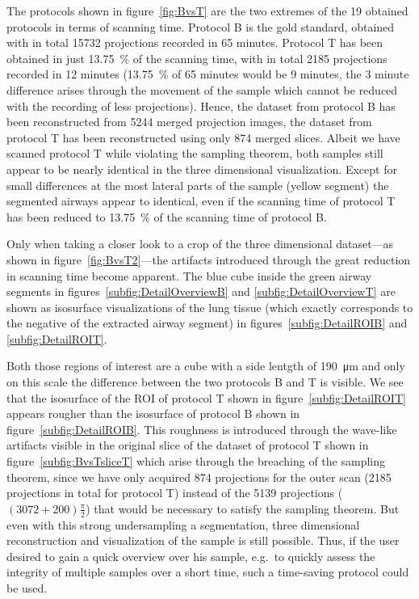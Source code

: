 The protocols shown in figure~\ref{fig:BvsT} are the two extremes of the 19 obtained protocols \cbstart in terms of scanning time. Protocol B is the gold standard, obtained with in total 15732 projections recorded in 65 minutes. Protocol T has been obtained in just \SI{13.75}{\percent} of the scanning time, with in total 2185 projections recorded in 12 minutes (\SI{13.75}{\percent} of 65 minutes would be 9 minutes, the 3 minute difference arises through the movement of the sample which cannot be reduced with the recording of less projections). Hence, the dataset from protocol B has been reconstructed from 5244 merged projection images, the dataset from protocol T has been reconstructed using only 874 merged slices. Albeit we have scanned protocol T while violating the sampling theorem, both samples still appear to be nearly identical in the three dimensional visualization. Except for small differences at the most lateral parts of the sample (yellow segment) the segmented airways appear to identical, even if the scanning time of protocol T has been reduced to \SI{13.75}{\percent} of the scanning time of protocol B.

Only when taking a closer look to a crop of the three dimensional dataset---as shown in figure~\ref{fig:BvsT2}---the artifacts introduced through the great reduction in scanning time become apparent. The blue cube inside the green airway segments in figures~\ref{subfig:DetailOverviewB} and \ref{subfig:DetailOverviewT} are shown as isosurface visualizations of the lung tissue (which exactly corresponds to the negative of the extracted airway segment) in figures~\ref{subfig:DetailROIB} and \ref{subfig:DetailROIT}.

Both those regions of interest are a cube with a side lentgth of \SI{190}{\micro\meter} and only on this scale the difference between the two protocols B and T is visible. We see that the isosurface of the ROI of protocol T shown in figure~\ref{subfig:DetailROIT} appears rougher than the isosurface of protocol B shown in figure~\ref{subfig:DetailROIB}. This roughness is introduced through the wave-like artifacts visible in the original slice of the dataset of protocol T shown in figure~\ref{subfig:BvsTsliceT} %
\cbend%
\cbstart %
which arise through the breaching of the sampling theorem, since we have only acquired 874 projections for the outer scan (2185 projections in total for protocol T) instead of the 5139 projections (\((3072+200)\frac{\pi}{2}\)) that would be necessary to satisfy the sampling theorem. But even with this strong undersampling a segmentation, three dimensional reconstruction and visualization of the sample is still possible. Thus, if the user desired to gain a quick overview over his sample, e.g.\ to quickly assess the integrity of multiple samples over a short time, such a time-saving protocol could be used.
\cbend

